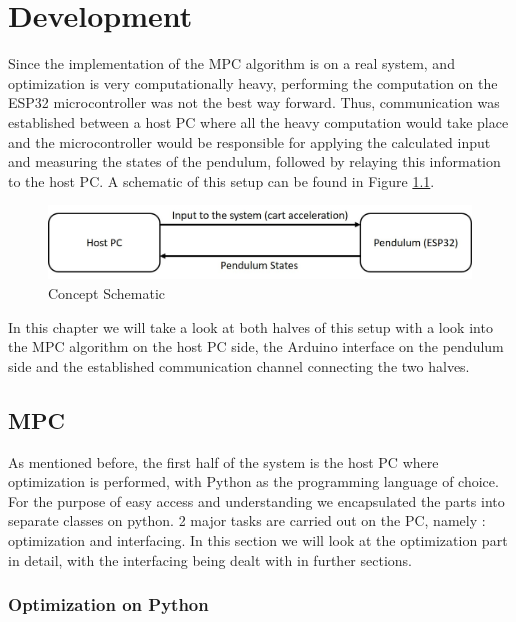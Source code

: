 \chapter{Development}\label{chap:third chapter}

Since the implementation of the MPC algorithm is on a real system, and optimization is very computationally heavy, performing the computation on the ESP32 microcontroller was not the best way forward. Thus, communication was established between a host PC where all the heavy computation would take place and the microcontroller would be responsible for applying the calculated input and  measuring the states of the pendulum, followed by relaying this information to the host PC. A schematic of this setup can be found in Figure \ref{fig:Comms Schematic}.


\begin{figure}[htbp]
	\centering
	\includegraphics[width=\textwidth]{"src/Images/CommsSchematic.jpg"}   
	\caption{Concept Schematic}
	\label{fig:Comms Schematic}
\end{figure}

In this chapter we will take a look at both halves of this setup with a look into the MPC algorithm on the host PC side, the Arduino interface on the pendulum side and the established communication channel connecting the two halves.

\section{MPC}

As mentioned before, the first half of the system is the host PC where optimization is performed, with Python as the programming language of choice. For the purpose of easy access and understanding we encapsulated the parts into separate classes on python. 2 major tasks are carried out on the PC, namely : optimization and interfacing. In this section we will look at the optimization part in detail, with the interfacing being dealt with in further sections.

\subsection{Optimization on Python} \label{Section 3.1.1}

